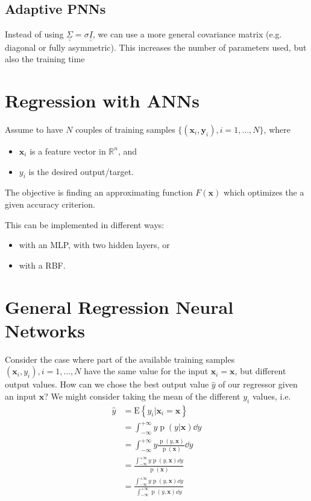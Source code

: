 \documentclass[oneside,onecolumn]{report}
\newcommand{\E}[1]{\text{E} \left\{ #1 \right\}}
\DeclareMathOperator*{\pdf}{p}
\begin{document}
\subsection{Adaptive PNNs}
Instead of using $\underline{\underline{\Sigma}} = \sigma \underline{\underline{I}}$, we can use a more general covariance matrix (e.g. diagonal or fully asymmetric).
This increases the number of parameters used, but also the training time



\section{Regression with ANNs}
Assume to have $N$ couples of training samples $\{ (\bm x_i, \bm y_i), i = 1, \dots, N\}$, where
\begin{itemize}
    \item $\bm x_i$ is a feature vector in $\mathbb R^n$, and
    \item $y_i$ is the desired output/target.
\end{itemize}

The objective is finding an approximating function $F(\bm x)$ which optimizes the a given accuracy criterion.

This can be implemented in different ways:
\begin{itemize}
    \item with an MLP, with two hidden layers, or
    \item with a RBF.
\end{itemize}


\section{General Regression Neural Networks}
Consider the case where part of the available training samples $(\bm x_i, y_i), i = 1, \dots, N$ have the same value for the input $\bm x_i = \bm x$, but different output values.
How can we chose the best output value $\widehat y$ of our regressor given an input $\bm x$?
We might consider taking the mean of the different $y_i$ values, i.e.
\begin{align*}
    \widehat y
    &= \E{y_i | \bm x_i = \bm x} \\
    &= \int_{-\infty}^{+\infty} y \pdf(y | \bm x) \dd y \\
    &= \int_{-\infty}^{+\infty} y \frac{\pdf(y, \bm x)}{\pdf(\bm x)} \dd y \\
    &= \frac{\int_{-\infty}^{+\infty} y \pdf(y, \bm x) \dd y}{\pdf(\bm x)} \\
    &= \frac{\displaystyle \int_{-\infty}^{+\infty} y \pdf(y, \bm x) \dd y}{\displaystyle \int_{-\infty}^{+\infty} \pdf(y, \bm x) \dd y}
\end{align*}
\end{document}
